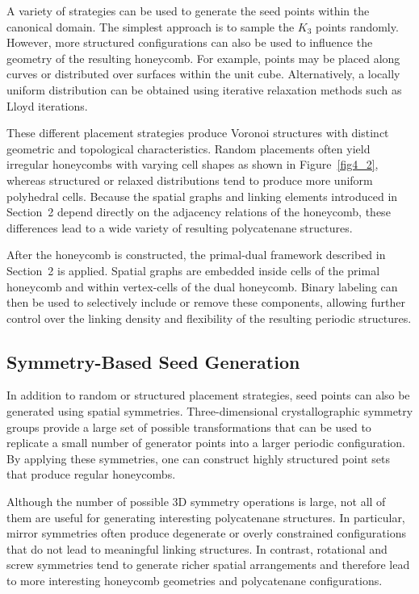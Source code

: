 \documentclass[times,twocolumn,final]{elsarticle}
\begin{document}
A variety of strategies can be used to generate the seed points within
the canonical domain. The simplest approach is to sample the $K_3$
points randomly. However, more structured configurations can also be
used to influence the geometry of the resulting honeycomb. For example,
points may be placed along curves or distributed over surfaces within
the unit cube. Alternatively, a locally uniform distribution can be
obtained using iterative relaxation methods such as Lloyd iterations.

These different placement strategies produce Voronoi structures with
distinct geometric and topological characteristics. Random placements
often yield irregular honeycombs with varying cell shapes as shown in Figure~\ref{fig4_2}, whereas
structured or relaxed distributions tend to produce more uniform
polyhedral cells. Because the spatial graphs and linking elements
introduced in Section~2 depend directly on the adjacency relations of
the honeycomb, these differences lead to a wide variety of resulting
polycatenane structures.

After the honeycomb is constructed, the primal-dual framework
described in Section~2 is applied. Spatial graphs are embedded inside
cells of the primal honeycomb and within vertex-cells of the dual
honeycomb. Binary labeling can then be used to selectively include
or remove these components, allowing further control over the
linking density and flexibility of the resulting periodic structures.

\subsection{Symmetry-Based Seed Generation}

In addition to random or structured placement strategies, seed points
can also be generated using spatial symmetries. Three-dimensional
crystallographic symmetry groups provide a large set of possible
transformations that can be used to replicate a small number of
generator points into a larger periodic configuration. By applying
these symmetries, one can construct highly structured point sets that
produce regular honeycombs.

Although the number of possible 3D symmetry operations is large, not
all of them are useful for generating interesting polycatenane
structures. In particular, mirror symmetries often produce degenerate
or overly constrained configurations that do not lead to meaningful
linking structures. In contrast, rotational and screw symmetries tend
to generate richer spatial arrangements and therefore lead to more
interesting honeycomb geometries and polycatenane configurations.
\end{document}
